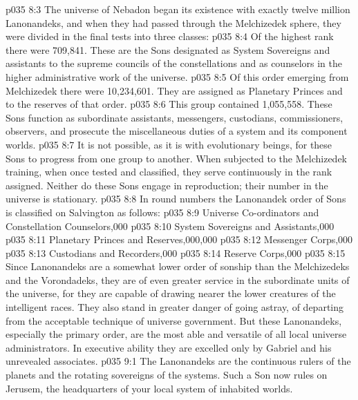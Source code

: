 \vs p035 8:3 The universe of Nebadon began its existence with exactly twelve million Lanonandeks, and when they had passed through the Melchizedek sphere, they were divided in the final tests into three classes:
\vs p035 8:4 \bibnobreakspace {} Of the highest rank there were 709,841. These are the Sons designated as System Sovereigns and assistants to the supreme councils of the constellations and as counselors in the higher administrative work of the universe.
\vs p035 8:5 \pc {}\bibnobreakspace {} Of this order emerging from Melchizedek there were 10,234,601. They are assigned as Planetary Princes and to the reserves of that order.
\vs p035 8:6 \pc {}\bibnobreakspace {} This group contained 1,055,558. These Sons function as subordinate assistants, messengers, custodians, commissioners, observers, and prosecute the miscellaneous duties of a system and its component worlds.
\vs p035 8:7 \pc It is not possible, as it is with evolutionary beings, for these Sons to progress from one group to another. When subjected to the Melchizedek training, when once tested and classified, they serve continuously in the rank assigned. Neither do these Sons engage in reproduction; their number in the universe is stationary.
\vs p035 8:8 In round numbers the Lanonandek order of Sons is classified on Salvington as follows:
\vs p035 8:9 \pc Universe Co\hyp{}ordinators and Constellation Counselors,000
\vs p035 8:10 System Sovereigns and Assistants,000
\vs p035 8:11 Planetary Princes and Reserves,000,000
\vs p035 8:12 Messenger Corps,000
\vs p035 8:13 Custodians and Recorders,000
\vs p035 8:14 Reserve Corps,000
\vs p035 8:15 \pc Since Lanonandeks are a somewhat lower order of sonship than the Melchizedeks and the Vorondadeks, they are of even greater service in the subordinate units of the universe, for they are capable of drawing nearer the lower creatures of the intelligent races. They also stand in greater danger of going astray, of departing from the acceptable technique of universe government. But these Lanonandeks, especially the primary order, are the most able and versatile of all local universe administrators. In executive ability they are excelled only by Gabriel and his unrevealed associates.
\vs p035 9:1 The Lanonandeks are the continuous rulers of the planets and the rotating sovereigns of the systems. Such a Son now rules on Jerusem, the headquarters of your local system of inhabited worlds.
